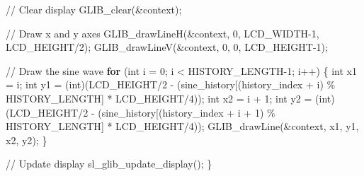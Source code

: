 \documentclass[
  9pt,
  letterpaper,
  abstract,
  titlepage]{scrbook}
\newenvironment{Shaded}{\begin{snugshade}}{\end{snugshade}}
\newcommand{\CommentTok}[1]{\textcolor[rgb]{0.37,0.37,0.37}{#1}}
\newcommand{\ControlFlowTok}[1]{\textcolor[rgb]{0.00,0.23,0.31}{\textbf{#1}}}
\newcommand{\DataTypeTok}[1]{\textcolor[rgb]{0.68,0.00,0.00}{#1}}
\newcommand{\DecValTok}[1]{\textcolor[rgb]{0.68,0.00,0.00}{#1}}
\newcommand{\NormalTok}[1]{\textcolor[rgb]{0.00,0.23,0.31}{#1}}
\newcommand{\OperatorTok}[1]{\textcolor[rgb]{0.37,0.37,0.37}{#1}}
\begin{document}
\begin{Shaded}
\begin{Highlighting}[]
  \CommentTok{// Clear display}
\NormalTok{  GLIB\_clear}\OperatorTok{(\&}\NormalTok{context}\OperatorTok{);}
  
  \CommentTok{// Draw x and y axes}
\NormalTok{  GLIB\_drawLineH}\OperatorTok{(\&}\NormalTok{context}\OperatorTok{,} \DecValTok{0}\OperatorTok{,}\NormalTok{ LCD\_WIDTH}\OperatorTok{{-}}\DecValTok{1}\OperatorTok{,}\NormalTok{ LCD\_HEIGHT}\OperatorTok{/}\DecValTok{2}\OperatorTok{);}
\NormalTok{  GLIB\_drawLineV}\OperatorTok{(\&}\NormalTok{context}\OperatorTok{,} \DecValTok{0}\OperatorTok{,} \DecValTok{0}\OperatorTok{,}\NormalTok{ LCD\_HEIGHT}\OperatorTok{{-}}\DecValTok{1}\OperatorTok{);}
  
  \CommentTok{// Draw the sine wave}
  \ControlFlowTok{for} \OperatorTok{(}\DataTypeTok{int}\NormalTok{ i }\OperatorTok{=} \DecValTok{0}\OperatorTok{;}\NormalTok{ i }\OperatorTok{\textless{}}\NormalTok{ HISTORY\_LENGTH}\OperatorTok{{-}}\DecValTok{1}\OperatorTok{;}\NormalTok{ i}\OperatorTok{++)} \OperatorTok{\{}
    \DataTypeTok{int}\NormalTok{ x1 }\OperatorTok{=}\NormalTok{ i}\OperatorTok{;}
    \DataTypeTok{int}\NormalTok{ y1 }\OperatorTok{=} \OperatorTok{(}\DataTypeTok{int}\OperatorTok{)(}\NormalTok{LCD\_HEIGHT}\OperatorTok{/}\DecValTok{2} \OperatorTok{{-}} \OperatorTok{(}\NormalTok{sine\_history}\OperatorTok{[(}\NormalTok{history\_index }\OperatorTok{+}\NormalTok{ i}\OperatorTok{)} \OperatorTok{\%}\NormalTok{ HISTORY\_LENGTH}\OperatorTok{]} \OperatorTok{*}\NormalTok{ LCD\_HEIGHT}\OperatorTok{/}\DecValTok{4}\OperatorTok{));}
    \DataTypeTok{int}\NormalTok{ x2 }\OperatorTok{=}\NormalTok{ i }\OperatorTok{+} \DecValTok{1}\OperatorTok{;}
    \DataTypeTok{int}\NormalTok{ y2 }\OperatorTok{=} \OperatorTok{(}\DataTypeTok{int}\OperatorTok{)(}\NormalTok{LCD\_HEIGHT}\OperatorTok{/}\DecValTok{2} \OperatorTok{{-}} \OperatorTok{(}\NormalTok{sine\_history}\OperatorTok{[(}\NormalTok{history\_index }\OperatorTok{+}\NormalTok{ i }\OperatorTok{+} \DecValTok{1}\OperatorTok{)} \OperatorTok{\%}\NormalTok{ HISTORY\_LENGTH}\OperatorTok{]} \OperatorTok{*}\NormalTok{ LCD\_HEIGHT}\OperatorTok{/}\DecValTok{4}\OperatorTok{));}
\NormalTok{    GLIB\_drawLine}\OperatorTok{(\&}\NormalTok{context}\OperatorTok{,}\NormalTok{ x1}\OperatorTok{,}\NormalTok{ y1}\OperatorTok{,}\NormalTok{ x2}\OperatorTok{,}\NormalTok{ y2}\OperatorTok{);}
  \OperatorTok{\}}
  
  \CommentTok{// Update display}
\NormalTok{  sl\_glib\_update\_display}\OperatorTok{();}
\OperatorTok{\}}
\end{Highlighting}
\end{Shaded}
\end{document}
